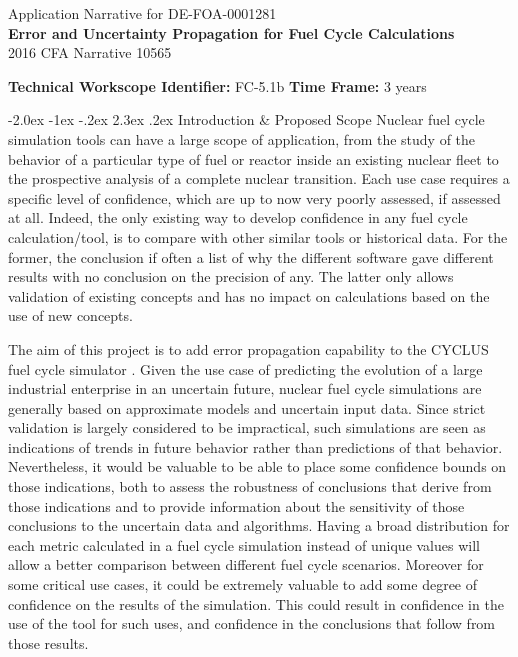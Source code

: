 \documentclass[dvips,12pt]{article}
\makeatletter
\renewcommand\section{\@startsection {section}{1}{\z@}%
                                   {-2.0ex \@plus -1ex \@minus -.2ex}%
                                   {2.3ex \@plus.2ex}%
                                   {\normalfont\bfseries}}%
\makeatother
\begin{document}
\begin{centering}
  Application Narrative for DE-FOA-0001281\\
  \textbf{\large Error and Uncertainty Propagation for Fuel Cycle Calculations}\\
  2016 CFA Narrative 10565\\
\end{centering}
\vspace{1em}

\noindent\textbf{Technical Workscope Identifier:} FC-5.1b \hspace{1.5in} \textbf{Time Frame:} 3 years

\section{Introduction \& Proposed Scope}
Nuclear fuel cycle simulation tools can have a large
scope of application, from the study of the
behavior of a particular type of fuel or reactor inside an
existing nuclear fleet to the prospective analysis
of a complete nuclear transition. 
Each use case
requires a specific level
of confidence, which are up to now very
poorly assessed, if assessed at all.
Indeed, the only existing way to develop confidence in
any fuel cycle calculation/tool, is to compare
with other similar tools or historical
data.  For the former, the conclusion if often 
a list of why the different software gave
different results with no conclusion on the
precision of any.  The latter only allows
validation of existing concepts and has no impact
on calculations based on the use of new
concepts.

The aim of this project is to add error
propagation capability to the CYCLUS fuel cycle
simulator \cite{CYCLUS}. Given the use case of predicting the
evolution of a large industrial enterprise in an
uncertain future, nuclear fuel cycle simulations
are generally based on approximate models and
uncertain input data.  Since strict validation is largely
considered to be impractical, such simulations are
seen as indications of trends in future behavior rather than
predictions of that behavior. Nevertheless, it
would be valuable to be able to place some
confidence bounds on those indications, both to
assess the robustness of conclusions that derive
from those indications and to provide information
about the sensitivity of those conclusions to the
uncertain data and algorithms.  Having a broad
distribution for each metric calculated in a fuel
cycle simulation instead of unique values will
allow a better comparison between different fuel
cycle scenarios.  Moreover for some critical
use cases, it could be extremely valuable to add
some degree of confidence on the results of the simulation.
This could result in confidence in the use of the tool for
such uses, and confidence in the conclusions that follow
from those results.
\end{document}
